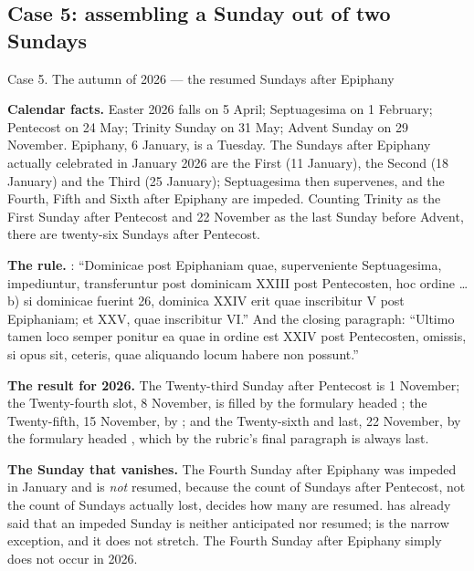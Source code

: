 \subsection{Case 5: assembling a Sunday out of two Sundays}

\begin{casebox}{Case 5. The autumn of 2026 --- the resumed Sundays after
Epiphany}

\textbf{Calendar facts.} Easter 2026 falls on 5 April; Septuagesima on 1
February; Pentecost on 24 May; Trinity Sunday on 31 May; Advent Sunday on 29
November. Epiphany, 6 January, is a Tuesday. The Sundays after Epiphany
actually celebrated in January 2026 are the First (11 January), the Second (18
January) and the Third (25 January); Septuagesima then supervenes, and the
Fourth, Fifth and Sixth after Epiphany are impeded. Counting Trinity as the
First Sunday after Pentecost and 22 November as the last Sunday before Advent,
there are twenty-six Sundays after Pentecost.

\begin{steps}
\item \textbf{The rule.} : ``Dominicae post Epiphaniam quae,
superveniente Septuagesima, impediuntur, transferuntur post dominicam XXIII
post Pentecosten, hoc ordine \dots{} b) si dominicae fuerint 26, dominica XXIV
erit quae inscribitur V post Epiphaniam; et XXV, quae inscribitur VI.'' And the
closing paragraph: ``Ultimo tamen loco semper ponitur ea quae in ordine est
XXIV post Pentecosten, omissis, si opus sit, ceteris, quae aliquando locum
habere non possunt.''

\item \textbf{The result for 2026.} The Twenty-third Sunday after Pentecost is
1 November; the Twenty-fourth slot, 8 November, is filled by the formulary
headed ; the
Twenty-fifth, 15 November, by ; and the Twenty-sixth and last, 22 November, by the formulary
headed , which by the rubric's
final paragraph is always last.

\item \textbf{The Sunday that vanishes.} The Fourth Sunday after Epiphany was
impeded in January and is \emph{not} resumed, because the count of Sundays
after Pentecost, not the count of Sundays actually lost, decides how many are
resumed.  has already said that an impeded Sunday is neither anticipated
nor resumed;  is the narrow exception, and it does not stretch. The
Fourth Sunday after Epiphany simply does not occur in 2026.


\end{steps}
\end{casebox}
